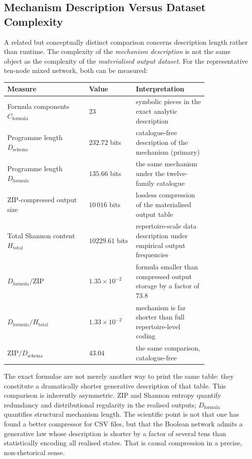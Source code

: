 \documentclass[11pt]{article}
\theoremstyle{definition}
\begin{document}
\subsection{Mechanism Description Versus Dataset Complexity}

A related but conceptually distinct comparison concerns description length rather than runtime. The
complexity of the \emph{mechanism description} is not the same object as the complexity of the
\emph{materialised output dataset}. For the representative ten-node mixed network, both can be
measured:

\begin{center}
\begin{tabular}{p{0.34\linewidth}p{0.18\linewidth}p{0.30\linewidth}}
\toprule
\textbf{Measure} & \textbf{Value} & \textbf{Interpretation} \\
\midrule
Formula components \(C_{\mathrm{formula}}\) & \(23\)
  & symbolic pieces in the exact analytic description \\
Programme length \(D_{\mathrm{schema}}\) & \(232.72\) bits
  & catalogue-free description of the mechanism (primary) \\
Programme length \(D_{\mathrm{formula}}\) & \(135.66\) bits
  & the same mechanism under the twelve-family catalogue \\
ZIP-compressed output size & \(10\,016\) bits
  & lossless compression of the materialised output table \\
Total Shannon content \(H_{\mathrm{total}}\) & \(10229.61\) bits
  & repertoire-scale data description under empirical output frequencies \\
\(D_{\mathrm{formula}}/\mathrm{ZIP}\) & \(1.35\times10^{-2}\)
  & formula smaller than compressed output storage by a factor of \(73.8\) \\
\(D_{\mathrm{formula}}/H_{\mathrm{total}}\) & \(1.33\times10^{-2}\)
  & mechanism is far shorter than full repertoire-level coding \\
\(\mathrm{ZIP}/D_{\mathrm{schema}}\) & \(43.04\)
  & the same comparison, catalogue-free \\
\bottomrule
\end{tabular}
\end{center}

The exact formulae are not merely another way to print the same table: they constitute a
dramatically shorter generative description of that table. This comparison is inherently asymmetric.
ZIP and Shannon entropy quantify redundancy and distributional regularity in the realised outputs;
\(D_{\mathrm{formula}}\) quantifies structural mechanism length. The scientific point is not that
one has found a better compressor for CSV files, but that the Boolean network admits a generative
law whose description is shorter by a factor of several tens than statistically encoding all realised
states. That is causal compression in a precise, non-rhetorical sense.
\end{document}
